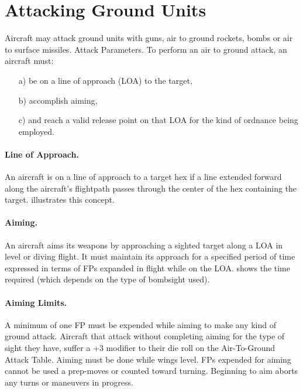 \section{Attacking Ground Units}

Aircraft may attack ground units with guns, air to ground rockets, bombs or air to surface missiles.
Attack Parameters. To perform an air to ground attack, an aircraft must:
\begin{enumerate}
    \item[a)] be on a line of approach (LOA) to the target,
    \item[b)] accomplish aiming,
    \item[c)] and reach a valid release point on that LOA for the kind of ordnance being employed.
\end{enumerate}

\paragraph{Line of Approach.} An aircraft is on a line of approach to a target hex if a line extended forward along the aircraft's flightpath passes through the center of the hex containing the target.  illustrates this concept. 



\paragraph{Aiming.} An aircraft aims its weapons by approaching a sighted target along a LOA in level or diving flight. It must maintain its approach for a specified period of time expressed in terms of FPs expanded in flight while on the LOA.  shows the time required (which depends on the type of bombsight used).

\paragraph{Aiming Limits.} A minimum of one FP must be expended while aiming to make any kind of ground attack. Aircraft that attack without completing aiming for the type of sight they have, suffer a +3 modifier to their die roll on the Air-To-Ground Attack Table. Aiming must be done while wings level. FPs expended for aiming cannot be used a prep-moves or counted toward turning. Beginning to aim aborts any turns or maneuvers in progress.  

